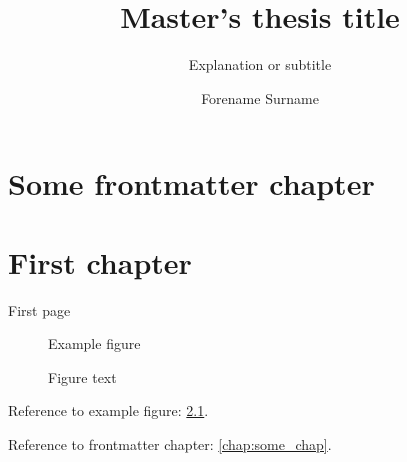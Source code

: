 \documentclass{uit-thesis-test}
\begin{document}
\title{Master's thesis title}
\subtitle{Explanation or subtitle}
\author{Forename Surname}

\maketitle

\frontmatter

\chapter{Some frontmatter chapter}\label{chap:some_chap}

\tableofcontents

\mainmatter

\chapter{First chapter}

First page

\begin{figure}[h]
\centering
Example figure
\caption{Figure text}\label{fig:example}
\end{figure}

\newpage

Reference to example figure: \ref{fig:example}.

Reference to frontmatter chapter: \autoref{chap:some_chap}.
\end{document}
